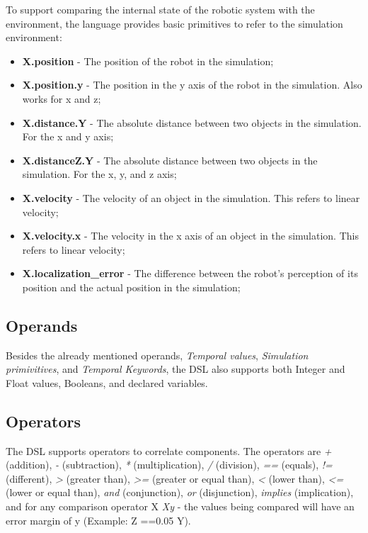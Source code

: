 To support comparing the internal state of the robotic system with the environment, the language provides basic primitives to refer to the simulation environment:

\begin{itemize}
\item {\bfseries X.position} - The position of the robot in the simulation;
\item {\bfseries X.position.y} - The position in the y axis of the robot in the simulation. Also works for x and z;
\item {\bfseries X.distance.Y} - The absolute distance between two objects in the simulation. For the x and y axis;
\item {\bfseries X.distanceZ.Y} - The absolute distance between two objects in the simulation. For the x, y, and z axis;
\item {\bfseries X.velocity} - The velocity of an object in the simulation. This refers to linear velocity;
\item {\bfseries X.velocity.x} - The velocity in the x axis of an object in the simulation. This refers to linear velocity;
\item {\bfseries X.localization\_error} - The difference between the robot's perception of its position and the actual position in the simulation;
\end{itemize}


\subsection{Operands}
\label{ssec:operands}

Besides the already mentioned operands, \textit{Temporal values}, \textit{Simulation primivitives}, and \textit{Temporal Keywords}, the DSL also supports both Integer and Float values, Booleans, and declared variables.


\subsection{Operators}
\label{ssec:operators}

The DSL supports operators to correlate components. The operators are \textit{+} (addition), \textit{-} (subtraction), \textit{*} (multiplication), \textit{/} (division), \textit{==} (equals), \textit{!=} (different), \textit{>} (greater than), \textit{>=} (greater or equal than), \textit{<} (lower than), \textit{<=} (lower or equal than), \textit{and} (conjunction), \textit{or} (disjunction), \textit{implies} (implication), and for any comparison operator X \textit{X{y}} - the values being compared will have an error margin of y (Example: Z =={0.05} Y).


